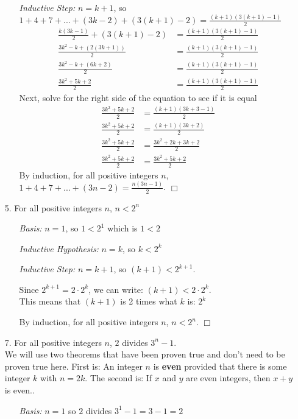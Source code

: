 \documentclass{article}
\begin{document}
\begin{itemize}
\begin{itemize}
        \item[]\emph{Inductive Step:} $n=k+1$, so $1+4+7+...+(3k-2)+(3(k+1)-2)=\frac{(k+1)(3(k+1)-1)}{2}$
        \begin{align}
            \frac{k(3k-1)}{2}+(3(k+1)-2)&=\frac{(k+1)(3(k+1)-1)}{2}\nonumber\\
            \frac{3k^2-k+(2(3k+1))}{2}&=\frac{(k+1)(3(k+1)-1)}{2}\nonumber\\
            \frac{3k^2-k+(6k+2)}{2}&=\frac{(k+1)(3(k+1)-1)}{2}\nonumber\\
            \frac{3k^2+5k+2}{2}&=\frac{(k+1)(3(k+1)-1)}{2}\nonumber
        \end{align}
        Next, solve for the right side of the equation to see if it is equal
        \begin{align}
            \frac{3k^2+5k+2}{2}&=\frac{(k+1)(3k+3-1)}{2}\nonumber\\
            \frac{3k^2+5k+2}{2}&=\frac{(k+1)(3k+2)}{2}\nonumber\\
            \frac{3k^2+5k+2}{2}&=\frac{3k^2+2k+3k+2}{2}\nonumber\\
            \frac{3k^2+5k+2}{2}&=\frac{3k^2+5k+2}{2}\nonumber
        \end{align}
        By induction, for all positive integers $n$, $1+4+7+...+(3n-2)=\frac{n(3n-1)}{2}$. $\Box$
    \end{itemize}
    \newpage
    \item[5.] For all positive integers $n$, $n<2^n$
    \begin{itemize}
        \item[]\emph{Basis:} $n=1$, so $1<2^1$ which is $1<2$
        
        \item[]\emph{Inductive Hypothesis:} $n=k$, so $k<2^k$
        
        \item[]\emph{Inductive Step:} $n=k+1$, so $(k+1)<2^{k+1}$. 
        \begin{center}
            Since $2^{k+1}=2\cdot2^k$, we can write: $(k+1)<2\cdot2^k$.\\
            This means that $(k+1)$ is 2 times what $k$ is: $2^k$
        \end{center}
        By induction, for all positive integers $n$, $n<2^n$. $\Box$
    \end{itemize}
    
    \item[7.] For all positive integers $n$, $2$ divides $3^n-1$.\\
    We will use two theorems that have been proven true and don't need to be proven true here.  First is: {\color{blue} An integer $n$ is \textbf{even} provided that there is some integer $k$ with $n=2k$}. The second is: {\color{purple} If $x$ and $y$ are even integers, then $x+y$ is even.}.
    \begin{itemize}
        \item[]\emph{Basis:} $n=1$ so $2$ divides $3^1-1=3-1=2$
        

\end{itemize}
\end{itemize}
\end{document}
